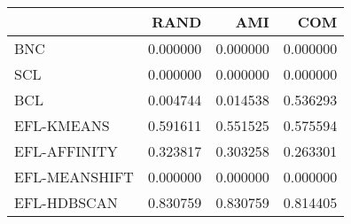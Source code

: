 \begin{tabular}{lrrr}
\toprule
 & RAND & AMI & COM \\
\midrule
BNC & 0.000000 & 0.000000 & 0.000000 \\
SCL & 0.000000 & 0.000000 & 0.000000 \\
BCL & 0.004744 & 0.014538 & 0.536293 \\
EFL-KMEANS & 0.591611 & 0.551525 & 0.575594 \\
EFL-AFFINITY & 0.323817 & 0.303258 & 0.263301 \\
EFL-MEANSHIFT & 0.000000 & 0.000000 & 0.000000 \\
EFL-HDBSCAN & 0.830759 & 0.830759 & 0.814405 \\
\bottomrule
\end{tabular}
